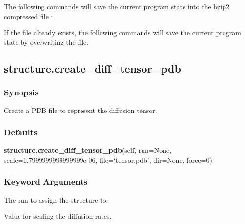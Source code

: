 

 The following commands will save the current program state into the bzip2 compressed file : 
  





 If the file  already exists, the following commands will save the current program state by overwriting the file. 
  



  

 \newpage 

 \subsection{structure.create\_diff\_tensor\_pdb} 

  
 \subsubsection{Synopsis} 

 Create a PDB file to represent the diffusion tensor. 
  

  
 \subsubsection{Defaults} 

 \textsf{\textbf{structure.create\_diff\_tensor\_pdb}(self, run=None, scale=1.7999999999999999e-06, file=`tensor.pdb', dir=None, force=0)} 

  
 \subsubsection{Keyword Arguments} 

   The run to assign the structure to.   

   Value for scaling the diffusion rates.   

